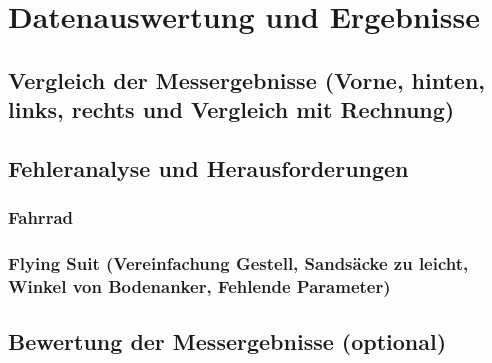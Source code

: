 \chapter{Datenauswertung und Ergebnisse}

\section{Vergleich der Messergebnisse (Vorne, hinten, links, rechts und Vergleich mit Rechnung)}
\section{Fehleranalyse und Herausforderungen}
\subsection{Fahrrad}
\subsection{Flying Suit (Vereinfachung Gestell, Sands\"acke zu leicht, Winkel von Bodenanker, Fehlende Parameter)}

\section{Bewertung der Messergebnisse (optional)}
